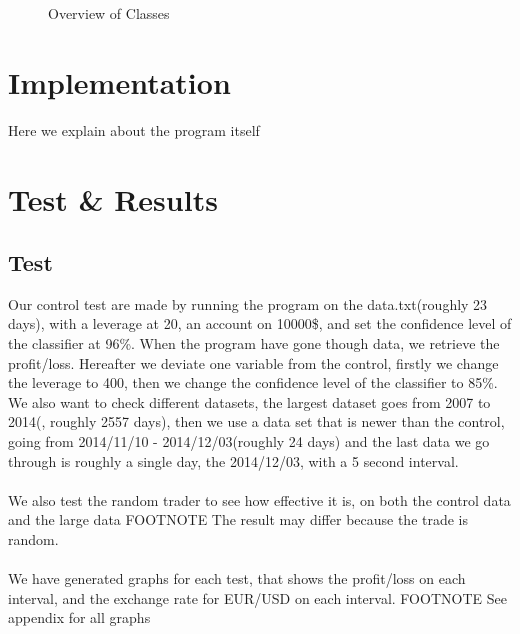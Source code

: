 \documentclass[10pt]{IEEEtran}
\begin{document}
\begin{figure}
\begin{center}
\end{center}
\caption{Overview of Classes}
\end{figure}




\section{Implementation}
Here we explain about the program itself

\section{Test \& Results}
\subsection{Test}
Our control test are made by running the program on the data.txt(roughly 23 days), with a leverage at 20, an account on 10000\$, and set the confidence level of the classifier at 96\%. When the program have gone though data, we retrieve the profit/loss. Hereafter we deviate one variable from the control, firstly we change the leverage to 400, then we change the confidence level of the classifier to 85\%.\\
We also want to check different datasets, the largest dataset goes from 2007 to 2014(, roughly 2557 days), then we use a data set that is newer than the control, going from 2014/11/10 - 2014/12/03(roughly 24 days) and the last data we go through is roughly a single day, the 2014/12/03, with a 5 second interval.\\
\\
We also test the random trader to see how effective it is, on both the control data and the large data FOOTNOTE The result may differ because the trade is random.\\
\\
We have generated graphs for each test, that shows the profit/loss on each interval, and the exchange rate for EUR/USD on each interval. FOOTNOTE See appendix for all graphs
\end{document}
